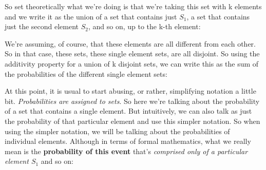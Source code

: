 \documentclass[pdftex, brazil, 12pt, twoside]{article}
\begin{document}
So set theoretically what we're doing is that we're
taking this set with k elements and we write it as
the union of a set that contains just $S_1$, a set that
contains just the second element $S_2$, and so on, up to
the k-th element:

\begin{figure}[H]
  \begin{center}
  \end{center}
\end{figure}

We're assuming, of course, that these elements are all
different from each other.
So in that case, these sets, these single element sets, are
all disjoint.
So using the additivity property for a union of k
disjoint sets, we can write this as the sum of the
probabilities of the different single element sets:

\begin{figure}[H]
  \begin{center}
  \end{center}
\end{figure}

At this point, it is usual to start abusing, or rather,
simplifying notation a little bit.
\emph{Probabilities are assigned to sets}.
So here we're talking about the probability of a set that
contains a single element.
But intuitively, we can also talk as just the probability
of that particular element and use this simpler notation.
So when using the simpler notation, we will be talking
about the probabilities of individual elements.
Although in terms of formal mathematics, what we really
mean is the \textbf{probability of this event} that's \emph{comprised
only of a particular element $S_1$} and so on:
\end{document}
